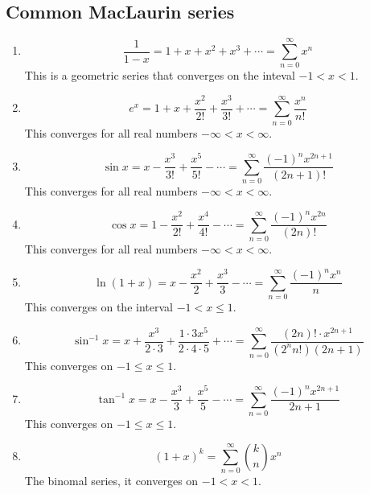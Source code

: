 \documentclass{report}
\begin{document}
    \subsection{Common MacLaurin series}
        \begin{enumerate}
            \item \[\frac{1}{1-x} = 1 + x + x^2 + x^3 + \cdots = \sum_{n=0}^{\infty} x^n\]
            This is a geometric series that converges on the inteval \(-1 < x < 1\).
            \item \[e^x = 1 + x + \frac{x^2}{2!} + \frac{x^3}{3!} + \cdots = \sum_{n=0}^{\infty} \frac{x^n}{n!}\]
            This converges for all real numbers \(- \infty < x < \infty\).
            \item \[\sin x = x - \frac{x^3}{3!} + \frac{x^5}{5!} - \cdots = \sum_{n=0}^{\infty} \frac{(-1)^n x^{2n+1}}{(2n+1)!}\]
            This converges for all real numbers \(- \infty < x < \infty\).
            \item \[\cos x = 1 - \frac{x^2}{2!} + \frac{x^4}{4!} - \cdots = \sum_{n=0}^{\infty} \frac{(-1)^n x^{2n}}{(2n)!}\]
            This converges for all real numbers \(- \infty < x < \infty\).
            \item \[\ln (1+x) = x - \frac{x^2}{2} + \frac{x^3}{3} - \cdots = \sum_{n=0}^{\infty} \frac{(-1)^n x^n}{n}\]
            This converges on the interval \(-1 < x \leq 1\).
            \item \[\sin^{-1} x = x + \frac{x^3}{2 \cdot 3} + \frac{1 \cdot 3x^5}{2 \cdot 4 \cdot 5} + \cdots = \sum_{n=0}^{\infty} \frac{(2n)! \cdot x^{2n+1}}{(2^n n!) (2n+1)}\]
            This converges on \(-1 \leq x \leq 1\).
            \item \[\tan^{-1} x = x - \frac{x^3}{3} + \frac{x^5}{5} - \cdots = \sum_{n=0}^{\infty} \frac{(-1)^n x^{2n+1}}{2n+1}\]
            This converges on \(-1 \leq x \leq 1\).
            \item \[(1+x)^k = \sum_{n=0}^{\infty} \binom{k}{n} x^n\]
            The binomal series, it converges on \(-1 < x < 1\).
        \end{enumerate}
\end{document}

